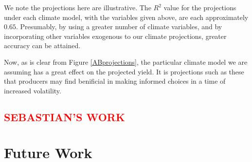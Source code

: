 \documentclass[11pt]{article}
\numberwithin{equation}{section}
\newcommand{\rred}[1]{\textcolor{red}{#1}}
\begin{document}
We note the projections here are illustrative. The $R^2$ value for the projections under each climate model, with the variables given above, are each approximately $0.65$. Presumably, by using a greater number of climate variables, and by incorporating other variables exogenous to our climate projections, greater accuracy can be attained.  

Now, as is clear from Figure \ref{ABprojections}, the particular climate model we are assuming has a great effect on the projected yield. It is projections such as these that producers may find benificial in making informed choices in a time of increased volatility.

\subsection{\rred{SEBASTIAN'S WORK}}%

\section{Future Work}
\end{document}
